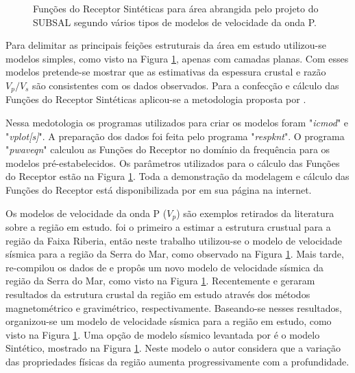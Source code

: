 \begin{figure}[!ht]
\caption{Funções do Receptor Sintéticas para área abrangida pelo projeto do SUBSAL segundo vários tipos de modelos de velocidade da onda P.}
\label{modelagem}
\end{figure}

Para delimitar as principais feições estruturais da área em estudo utilizou-se modelos simples, como visto na Figura \ref{modelagem}, apenas com camadas planas. Com esses modelos pretende-se mostrar que as estimativas da espessura crustal e razão $V_{p}/V_{s}$ são consistentes com os dados observados. Para a confecção e cálculo das Funções do Receptor Sintéticas aplicou-se a metodologia proposta por \cite{Ammon_waterlevel_1997}. 

Nessa medotologia os programas utilizados para criar os modelos foram "\textit{icmod}" e "\textit{vplot[s]}". A preparação dos dados foi feita pelo programa "\textit{respknt}". O programa "\textit{pwaveqn}" calculou as Funções do Receptor no domínio da frequência para os modelos pré-estabelecidos. Os parâmetros utilizados para o cálculo das Funções do Receptor estão na Figura \ref{modelagem}. Toda a demonstração da modelagem e cálculo das Funções do Receptor está disponibilizada por \cite{Ammon_waterlevel_1997} em sua página na internet.

Os modelos de velocidade da onda P ($V_{p}$) são exemplos retirados da literatura sobre a região em estudo. \cite{Bassini_1986} foi o primeiro a estimar a estrutura crustual para a região da Faixa Riberia, então neste trabalho utilizou-se o modelo de velocidade sísmica para a região da Serra do Mar, como observado na Figura \ref{modelagem}. Mais tarde, \cite{sand_franca_crustal_2004} re-compilou os dados de \cite{Bassini_1986} e propôs um novo modelo de velocidade sísmica da região da Serra do Mar, como visto na Figura \ref{modelagem}. Recentemente \cite{flora_solon_ancient_2013} e \cite{Silva_2014} geraram resultados da estrutura crustal da região em estudo através dos métodos magnetométrico e gravimétrico, respectivamente. Baseando-se nesses resultados, organizou-se um modelo de velocidade sísmica para a região em estudo, como visto na Figura \ref{modelagem}. Uma opção de modelo sísmico levantada por \cite{sand_franca_crustal_2004} é o modelo Sintético, mostrado na Figura \ref{modelagem}. Neste modelo o autor considera que a variação das propriedades físicas da região aumenta progressivamente com a profundidade.

